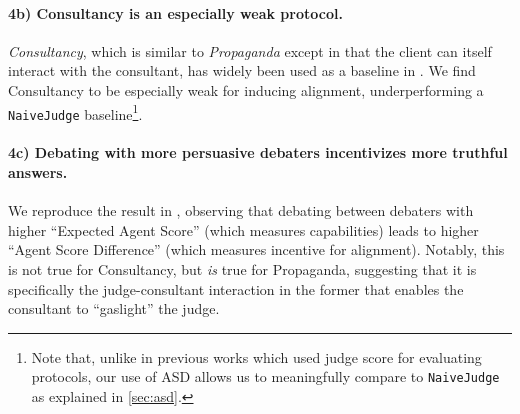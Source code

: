 \paragraph{4b) Consultancy is an especially weak protocol.} \emph{Consultancy}, which is similar to \emph{Propaganda} except in that the client can itself interact with the consultant, has widely been used as a baseline in \previouswork{}. We find Consultancy to be especially weak for inducing alignment, underperforming a \texttt{NaiveJudge} baseline\footnote{Note that, unlike in previous works which used judge score for evaluating protocols, our use of ASD allows us to meaningfully compare to \texttt{NaiveJudge} as explained in \cref{sec:asd}.}.

\paragraph{4c) Debating with more persuasive debaters incentivizes more truthful answers.} We reproduce the result in \citet{khanDebatingMorePersuasive2024}, observing that debating between debaters with higher ``Expected Agent Score'' (which measures capabilities) leads to higher ``Agent Score Difference'' (which measures incentive for alignment). Notably, this is not true for Consultancy, but \emph{is} true for Propaganda, suggesting that it is specifically the judge-consultant interaction in the former that enables the consultant to ``gaslight'' the judge.

